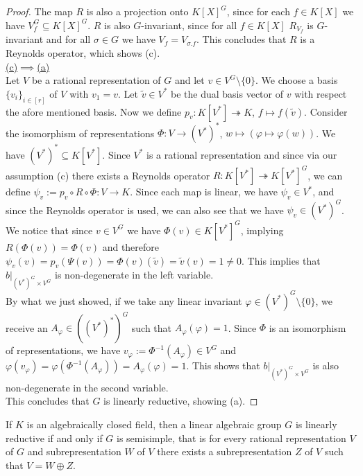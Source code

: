 \begin{proof}
  The map $R$ is also a projection onto $K[X]^G$, since for each $f \in K[X]$ we have $V_f^G \subseteq K[X]^G$.
  $R$ is also $G$-invariant, since for all $f \in K[X]$ $R_{V_f}$ is $G$-invariant and for all $\sigma \in G$ we have $V_f = V_{\sigma.f}$.
  This concludes that $R$ is a Reynolds operator, which shows (c).  \\
  \underline{(c)$\implies$(a)}  \\
  Let $V$ be a rational representation of $G$ and let $v \in V^G \setminus \{0\}$.
  We choose a basis $\{v_i\}_{i\in [r]}$ of $V$ with $v_1 = v$.
  Let $\tilde{v} \in V^\ast$ be the dual basis vector of $v$ with respect the afore mentioned basis.
  Now we define $p_v \colon K[V^\ast] \twoheadrightarrow K$, $f \mapsto f(\tilde{v})$.
  Consider the isomorphism of representations $\Phi \colon V \longrightarrow (V^\ast)^\ast$, $w \mapsto (\varphi \mapsto \varphi (w))$.
  We have $(V^\ast)^\ast \subseteq K[V^\ast]$.
  Since $V^\ast$ is a rational representation and since via our assumption (c) there exists a Reynolds operator $R \colon K[V^\ast] \twoheadrightarrow K[V^\ast]^G$, we can define $ \psi_v := p_v \circ R \circ \Phi \colon V \longrightarrow K$.
  Since each map is linear, we have $\psi_v \in V^\ast$, and since the Reynolds operator is used, we can also see that we have $\psi_v \in (V^\ast)^G$.
  We notice that since $v \in V^G$ we have $\Phi (v) \in K[V^\ast]^G$, implying $R(\Phi(v))=\Phi(v)$ and therefore $\psi_v (v) = p_v (\Psi(v)) = \Phi (v) (\tilde{v}) = \tilde{v} (v) = 1 \neq 0$.
  This implies that $\left. b\right|_{(V^\ast)^G \times V^G}$ is non-degenerate in the left variable.\\
  By what we just showed, if we take any linear invariant $\varphi \in (V^\ast)^G \setminus \{0\}$, we receive an $A_\varphi \in ((V^\ast)^\ast)^G$ such that $A_\varphi(\varphi) = 1$.
  Since $\Phi$ is an isomorphism of representations, we have $v_\varphi := \Phi^{-1}(A_\varphi) \in V^G$ and $\varphi (v_\varphi) = \varphi (\Phi^{-1}(A_\varphi)) = A_\varphi (\varphi) = 1$.
  This shows that $\left. b\right|_{(V^\ast)^G \times V^G}$ is also non-degenerate in the second variable.\\
  This concludes that $G$ is linearly reductive, showing (a).
\end{proof}

\begin{theorem}\label{decomp}
  If $K$ is an algebraically closed field, then a linear algebraic group $G$ is linearly reductive if and only if $G$ is semisimple, that is for every rational representation $V$ of $G$ and subrepresentation $W$ of $V$ there exists a subrepresentation $Z$ of $V$ such that $V = W \oplus Z$.
\end{theorem}

